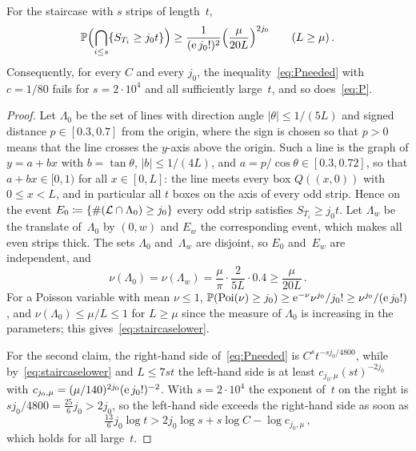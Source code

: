\documentclass[11pt,letterpaper]{article}
\begin{document}
\begin{proposition}
\label{prop:staircase}
For the staircase with $s$ strips of length~$t$,
\begin{equation}
\label{eq:staircaselower}
  \mathbb P\Bigl(\bigcap_{i\le s}\{S_{T_i}\ge j_0t\}\Bigr)\ge\frac{1}{(\mathrm{e}\,j_0!)^2}\Bigl(\frac{\mu}{20L}\Bigr)^{2j_0}\qquad(L\ge\mu)\,.
\end{equation}
Consequently, for every $C$ and every $j_0$, the inequality~\eqref{eq:Pneeded} with $c=1/80$ fails for $s=2\cdot10^4$ and all sufficiently large~$t$, and so does~\eqref{eq:P}.
\end{proposition}

\begin{proof}
Let $\Lambda_0$ be the set of lines with direction angle $\lvert\theta\rvert\le1/(5L)$ and signed distance $p\in[0.3,0.7]$ from the origin, where the sign is chosen so that $p>0$ means that the line crosses the $y$-axis above the origin. Such a line is the graph of $y=a+bx$ with $b=\tan\theta$, $\lvert b\rvert\le1/(4L)$, and $a=p/\cos\theta\in[0.3,0.72]$, so that $a+bx\in[0,1)$ for all $x\in[0,L]$: the line meets every box $Q((x,0))$ with $0\le x<L$, and in particular all $t$ boxes on the axis of every odd strip. Hence on the event $E_0\coloneqq\{\#(\mathcal L\cap\Lambda_0)\ge j_0\}$ every odd strip satisfies $S_{T_i}\ge j_0t$. Let $\Lambda_w$ be the translate of~$\Lambda_0$ by $(0,w)$ and $E_w$ the corresponding event, which makes all even strips thick. The sets $\Lambda_0$ and~$\Lambda_w$ are disjoint, so $E_0$ and~$E_w$ are independent, and
\begin{equation*}
  \nu(\Lambda_0)=\nu(\Lambda_w)=\frac\mu\pi\cdot\frac{2}{5L}\cdot0.4\ge\frac{\mu}{20L}\,.
\end{equation*}
For a Poisson variable with mean $\nu\le1$, $\mathbb P(\mathrm{Poi}(\nu)\ge j_0)\ge\mathrm{e}^{-\nu}\nu^{j_0}/j_0!\ge\nu^{j_0}/(\mathrm{e}\,j_0!)$, and $\nu(\Lambda_0)\le\mu/L\le1$ for $L\ge\mu$ since the measure of $\Lambda_0$ is increasing in the parameters; this gives~\eqref{eq:staircaselower}.

For the second claim, the right-hand side of~\eqref{eq:Pneeded} is $C^st^{-sj_0/4800}$, while by~\eqref{eq:staircaselower} and $L\le7st$ the left-hand side is at least $c_{j_0,\mu}(st)^{-2j_0}$ with $c_{j_0,\mu}=(\mu/140)^{2j_0}(\mathrm{e}\,j_0!)^{-2}$. With $s=2\cdot10^4$ the exponent of~$t$ on the right is $sj_0/4800=\tfrac{25}6j_0>2j_0$, so the left-hand side exceeds the right-hand side as soon as
\begin{equation*}
  \tfrac{13}{6}j_0\log t>2j_0\log s+s\log C-\log c_{j_0,\mu}\,,
\end{equation*}
which holds for all large~$t$.
\end{proof}
\end{document}
